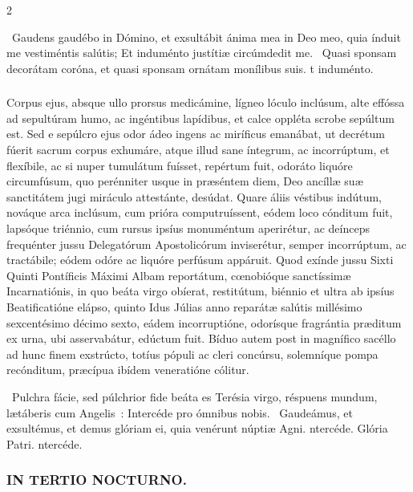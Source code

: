 \documentclass[9pt,twoside]{extarticle}
\begin{document}
\begin{multicols}{2}
\begin{tightlist}{}
\item {}~Gaudens gaudébo in Dómino, et exsultábit ánima mea in Deo meo, quia índuit me vestiméntis salútis; \textred{*} Et induménto justítiæ circúmdedit me. ~Quasi sponsam decorátam coróna, et quasi sponsam ornátam monílibus suis. t induménto.
\end{tightlist}

\subsubsection*{\center {}}
\lettrine{C}orpus ejus, absque ullo prorsus medicámine, lígneo lóculo inclúsum, alte effóssa ad sepultúram humo, ac ingéntibus lapídibus, et calce oppléta scrobe sepúltum est. Sed e sepúlcro ejus odor ádeo ingens ac miríficus emanábat, ut decrétum fúerit sacrum corpus exhumáre, atque illud sane íntegrum, ac incorrúptum, et flexíbile, ac si nuper tumulátum fuísset, repértum fuit, odoráto liquóre circumfúsum, quo perénniter usque in præséntem diem, Deo ancíllæ suæ sanctitátem jugi miráculo attestánte, desúdat. Quare áliis véstibus indútum, nováque arca inclúsum, cum prióra computruíssent, eódem loco cónditum fuit, lapsóque triénnio, cum rursus ipsíus monuméntum aperirétur, ac deínceps frequénter jussu Delegatórum Apostolicórum inviserétur, semper incorrúptum, ac tractábile; eódem odóre ac liquóre perfúsum appáruit. Quod exínde jussu Sixti Quinti Pontíficis Máximi Albam reportátum, cœnobióque sanctíssimæ Incarnatiónis, in quo beáta virgo obíerat, restitútum, biénnio et ultra ab ipsíus Beatificatióne elápso, quinto Idus Júlias anno reparátæ salútis millésimo sexcentésimo décimo sexto, eádem incorruptióne, odorísque fragrántia præditum ex urna, ubi asservabátur, edúctum fuit. Bíduo autem post in magnífico sacéllo ad hunc finem exstrúcto, totíus pópuli ac cleri concúrsu, solemníque pompa recónditum, præcípua ibídem veneratióne cólitur.

\begin{tightlist}{}
\item {}~Pulchra fácie, sed púlchrior fide beáta es Terésia virgo, réspuens mundum, lætáberis cum Angelis~: \textred{*} Intercéde pro ómnibus nobis. ~Gaudeámus, et exsultémus, et demus glóriam ei, quia venérunt núptiæ Agni. ntercéde. Glória Patri. ntercéde.
\end{tightlist}

\subsubsection*{\center \textsc{IN TERTIO NOCTURNO.}}

\end{multicols}
\end{document}

